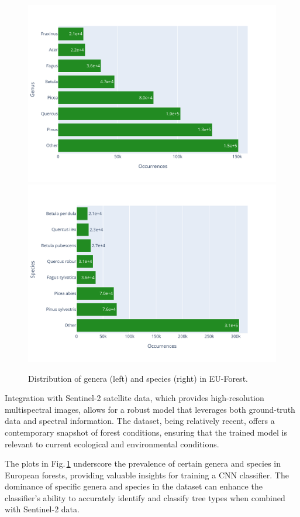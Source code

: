 \begin{figure}[!thb]
    \centering

    \includegraphics[width=0.48\linewidth, trim={0 0 2cm 0}]{figures/figures_labels/genus_cutoff.pdf}
    \includegraphics[width=0.48\linewidth, trim={0 0 2cm 0}]{figures/figures_labels/species_cutoff.pdf}

    \caption{Distribution of genera (left) and species (right) in EU-Forest.}
    \label{fig:cutoff_barplots}
\end{figure}

Integration with Sentinel-2 satellite data, which provides high-resolution multispectral images, allows for a robust model that leverages both ground-truth data and spectral information. The dataset, being relatively recent, offers a contemporary snapshot of forest conditions, ensuring that the trained model is relevant to current ecological and environmental conditions. 

The plots in Fig.\,\ref{fig:cutoff_barplots} underscore the prevalence of certain genera and species in European forests, providing valuable insights for training a CNN classifier. The dominance of specific genera and species in the dataset can enhance the classifier's ability to accurately identify and classify tree types when combined with Sentinel-2 data.

